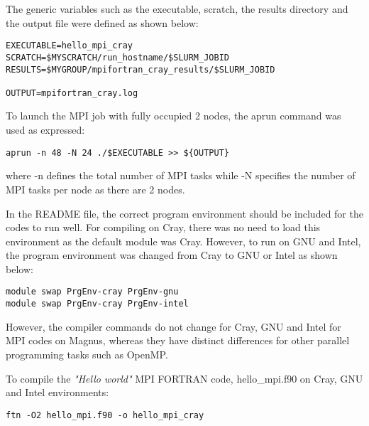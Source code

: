 The generic variables such as the executable, scratch, the results directory and the output file were defined as shown below:

\begin{tcolorbox}
\begin{Verbatim}[fontsize=\scriptsize]
EXECUTABLE=hello_mpi_cray
SCRATCH=$MYSCRATCH/run_hostname/$SLURM_JOBID
RESULTS=$MYGROUP/mpifortran_cray_results/$SLURM_JOBID

OUTPUT=mpifortran_cray.log 
\end{Verbatim}
\end{tcolorbox}

To launch the MPI job with fully occupied 2 nodes, the aprun command was used as expressed:

\begin{tcolorbox}
\begin{Verbatim}[fontsize=\scriptsize]
aprun -n 48 -N 24 ./$EXECUTABLE >> ${OUTPUT}
\end{Verbatim}
\end{tcolorbox}

where -n defines the total number of MPI tasks while -N specifies the number of MPI tasks per node as there are 2 nodes.

In the README file, the correct program environment should be included for the codes to run well. For compiling on Cray, there was no need to load
this environment as the default module was Cray. However, to run on GNU and Intel, the program environment was changed from Cray to GNU or Intel as
shown below:

\begin{tcolorbox}
\begin{Verbatim}[fontsize=\scriptsize]
module swap PrgEnv-cray PrgEnv-gnu
module swap PrgEnv-cray PrgEnv-intel
\end{Verbatim}
\end{tcolorbox}

However, the compiler commands do not change for Cray, GNU and Intel for MPI codes on Magnus, whereas they have distinct differences for other parallel
programming tasks such as OpenMP.

To compile the \emph{"Hello world"} MPI FORTRAN code, hello\_mpi.f90 on Cray, GNU and Intel environments:

\begin{tcolorbox}
\begin{Verbatim}[fontsize=\scriptsize]
ftn -O2 hello_mpi.f90 -o hello_mpi_cray
\end{Verbatim}
\end{tcolorbox}

